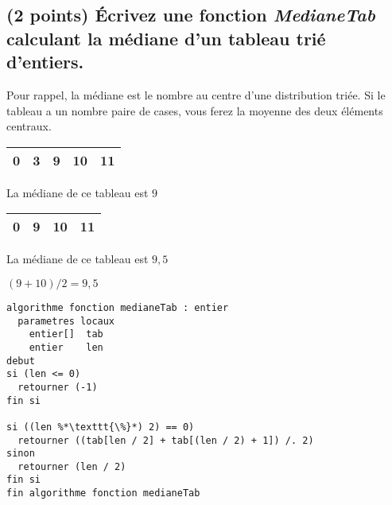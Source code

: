 \documentclass[11pt,a4paper]{article}
\begin{document}

\newpage

\vfillFirst

\subsection{(2 points) \'Ecrivez une fonction \og \textit{MedianeTab} \fg{} calculant la médiane d'un tableau trié d'entiers. }


Pour rappel, la médiane est le nombre au centre d'une distribution triée. Si le tableau a un nombre paire de cases, vous ferez la moyenne des deux éléments centraux.


\begin{table}[h!]
  \centering
  \begin{minipage}{0.4\textwidth}
    \centering
    \begin{tabular}{| c | c | c | c | c |}
      \hline
      0 & 3 & 9 & 10 & 11 \\
      \hline
    \end{tabular}

  \smallskip

  La médiane de ce tableau est $ 9 $
  \end{minipage}
    \hfillx
    \begin{minipage}{0.4\textwidth}
    \centering
    \begin{tabular}{| c | c | c | c |}
      \hline
      0 & 9 & 10 & 11 \\
      \hline
    \end{tabular}

  \smallskip

  La médiane de ce tableau est $ 9,5 $

  $ (9 + 10) / 2 = 9,5 $
  \end{minipage}
\end{table}

\begin{center}

\begin{lstlisting}[style=algorithmique]
algorithme fonction medianeTab : entier
  parametres locaux
    entier[]  tab
    entier    len
debut
si (len <= 0)
  retourner (-1)
fin si

si ((len %*\texttt{\%}*) 2) == 0)
  retourner ((tab[len / 2] + tab[(len / 2) + 1]) /. 2)
sinon
  retourner (len / 2)
fin si
fin algorithme fonction medianeTab \end{lstlisting}

\end{center}
\end{document}
